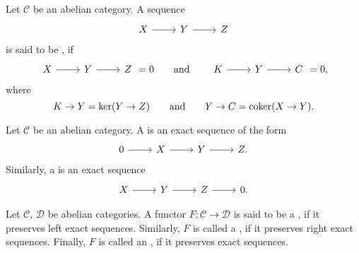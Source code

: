 \begin{definition}[Exactness]
	Let $\mathcal{C}$ be an abelian category. A sequence
	\begin{equation*}
		\begin{tikzcd}
			X \arrow[r] & Y \arrow[r] & Z
		\end{tikzcd}
	\end{equation*}
	\noindent is said to be , if 
	\begin{equation*}
		\begin{tikzcd}
			X \arrow[r] & Y \arrow[r] & Z 
		\end{tikzcd} = 0 \qquad \text{and} \qquad
		\begin{tikzcd}
			K \arrow[r] & Y \arrow[r] & C
		\end{tikzcd} = 0,
	\end{equation*}
	\noindent where
	\begin{equation*}
		K \to Y = \ker(Y \to Z)
		\qquad \text{and} \qquad
		Y \to C = \operatorname{coker}(X \to Y).
	\end{equation*}
\end{definition}

\begin{definition}
	Let $\mathcal{C}$ be an abelian category. A  is an exact sequence of the form
	\begin{equation*}
		\begin{tikzcd}
			0 \arrow[r] & X \arrow[r] & Y \arrow[r] & Z.
		\end{tikzcd}
	\end{equation*}
	Similarly, a  is an exact sequence
	\begin{equation*}
		\begin{tikzcd}
			X \arrow[r] & Y \arrow[r] & Z \arrow[r] & 0.
		\end{tikzcd}
	\end{equation*}
\end{definition}

\begin{definition}
	Let $\mathcal{C}$, $\mathcal{D}$ be abelian categories. A functor $F : \mathcal{C} \to \mathcal{D}$ is said to be a , if it preserves left exact sequences. Similarly, $F$ is called a , if it preserves right exact sequences. Finally, $F$ is called an , if it preserves exact sequences.
\end{definition}

